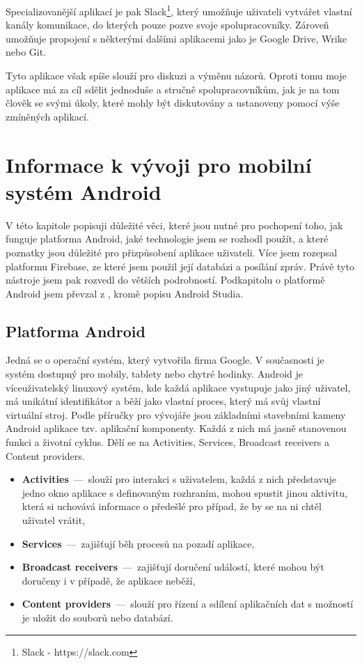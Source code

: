 Specializovanější aplikací je pak Slack\footnote{Slack - https://slack.com}, který umožňuje uživateli vytvářet vlastní kanály komunikace, do kterých pouze pozve svoje spolupracovníky. Zároveň umožňuje propojení s některými dalšími aplikacemi jako je Google Drive, Wrike nebo Git.

Tyto aplikace však spíše slouží pro diskuzi a výměnu názorů. Oproti tomu moje aplikace má za cíl sdělit jednoduše a stručně spolupracovníkům, jak je na tom člověk se svými úkoly, které mohly být diskutovány a ustanoveny pomocí výše zmíněných aplikací. 

\chapter{Informace k vývoji pro mobilní systém Android}

V této kapitole popisuji důležité věci, které jsou nutné pro pochopení toho, jak funguje platforma Android, jaké technologie jsem se rozhodl použít, a které poznatky jsou důležité pro přizpůsobení aplikace uživateli. Více jsem rozepsal platformu Firebase, ze které jsem použil její databázi a posílání zpráv. Právě tyto nástroje jsem pak rozvedl do větších podrobností. Podkapitolu o platformě Android jsem převzal z \cite{android}, kromě popisu Android Studia.

\section{Platforma Android}

Jedná se o operační systém, který vytvořila firma Google. V současnosti je systém dostupný pro mobily, tablety nebo chytré hodinky. Android je víceuživatelský linuxový systém, kde každá aplikace vystupuje jako jiný uživatel, má unikátní identifikátor a běží jako vlastní proces, který má svůj vlastní virtuální stroj. Podle příručky pro vývojáře \cite{android} jsou základními stavebními kameny Android aplikace tzv. aplikační komponenty. Každá z nich má jasně stanovenou funkci a životní cyklus. Dělí se na Activities, Services, Broadcast receivers a Content providers. 

\begin{itemize}
\item \textbf{Activities} \,---\, slouží pro interakci s uživatelem, každá z nich představuje jedno okno aplikace s definovaným rozhraním, mohou spustit jinou aktivitu, která si uchovává informace o předešlé pro případ, že by se na ni chtěl uživatel vrátit,
\item \textbf{Services} \,---\, zajišťují běh procesů na pozadí aplikace,
\item \textbf{Broadcast receivers} \,---\, zajišťují doručení událostí, které mohou být doručeny i v případě, že aplikace neběží,
\item \textbf{Content providers} \,---\, slouží pro řízení a sdílení aplikačních dat s možností je uložit do souborů nebo databází.
\end{itemize}

